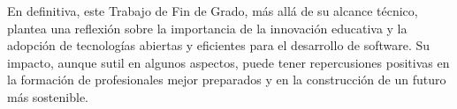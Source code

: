 En definitiva, este Trabajo de Fin de Grado, más allá de su alcance técnico, plantea una reflexión sobre la importancia de la innovación educativa y la adopción de tecnologías abiertas y eficientes para el desarrollo de software. Su impacto, aunque sutil en algunos aspectos, puede tener repercusiones positivas en la formación de profesionales mejor preparados y en la construcción de un futuro más sostenible.